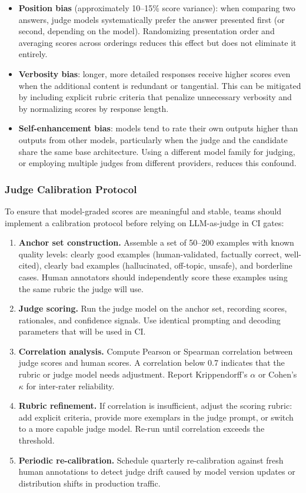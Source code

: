 \begin{itemize}
    \item \textbf{Position bias} (approximately 10--15\% score variance): when comparing two answers, judge models systematically prefer the answer presented first (or second, depending on the model). Randomizing presentation order and averaging scores across orderings reduces this effect but does not eliminate it entirely.
    \item \textbf{Verbosity bias}: longer, more detailed responses receive higher scores even when the additional content is redundant or tangential. This can be mitigated by including explicit rubric criteria that penalize unnecessary verbosity and by normalizing scores by response length.
    \item \textbf{Self-enhancement bias}: models tend to rate their own outputs higher than outputs from other models, particularly when the judge and the candidate share the same base architecture. Using a different model family for judging, or employing multiple judges from different providers, reduces this confound.
\end{itemize}

\subsubsection{Judge Calibration Protocol}
To ensure that model-graded scores are meaningful and stable, teams should implement a calibration protocol before relying on LLM-as-judge in CI gates:

\begin{enumerate}
    \item \textbf{Anchor set construction.} Assemble a set of 50--200 examples with known quality levels: clearly good examples (human-validated, factually correct, well-cited), clearly bad examples (hallucinated, off-topic, unsafe), and borderline cases. Human annotators should independently score these examples using the same rubric the judge will use.
    \item \textbf{Judge scoring.} Run the judge model on the anchor set, recording scores, rationales, and confidence signals. Use identical prompting and decoding parameters that will be used in CI.
    \item \textbf{Correlation analysis.} Compute Pearson or Spearman correlation between judge scores and human scores. A correlation below 0.7 indicates that the rubric or judge model needs adjustment. Report Krippendorff's $\alpha$ or Cohen's $\kappa$ for inter-rater reliability.
    \item \textbf{Rubric refinement.} If correlation is insufficient, adjust the scoring rubric: add explicit criteria, provide more exemplars in the judge prompt, or switch to a more capable judge model. Re-run until correlation exceeds the threshold.
    \item \textbf{Periodic re-calibration.} Schedule quarterly re-calibration against fresh human annotations to detect judge drift caused by model version updates or distribution shifts in production traffic.
\end{enumerate}

